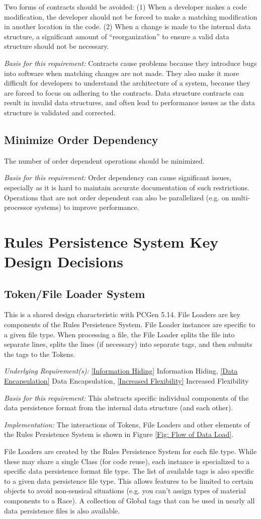 \documentclass[12pt,letterpaper]{article}
\newcommand{\systemEOS}{Rules Persistence System}
\newcommand{\system}{\systemEOS{} }
\newcommand{\textem}[1]{\emph{#1}}
\newcommand{\nsection}[1]{\newpage \section{#1}}
\newcommand{\lnsection}[1]{\label{#1}\nsection{#1}}
\newcommand{\lsubsection}[1]{\label{#1}\subsection{#1}}
\newcommand{\myref}[1]{\ref{#1} #1}
\newcommand{\basis}{\noindent\textem{Basis for this requirement:} }
\newcommand{\impl}{\noindent\textem{Implementation:} }
\newcommand{\under}{\noindent\textem{Underlying Requirement(s):} }
\begin{document}
Two forms of contracts should be avoided: (1) When a developer makes a code modification,
the developer should not be forced to make a matching modification in another location in the
code. (2) When a change is made to the internal data structure, a significant amount of
``reorganization'' to ensure a valid data structure should not be necessary.

\basis Contracts cause problems because they introduce bugs into software when matching changes
are not made.  They also make it more difficult for developers to understand the architecture
of a system, because they are forced to focus on adhering to the contracts.  Data structure
contracts can result in invalid data structures, and often lead to performance issues as the
data structure is validated and corrected.

\lsubsection{Minimize Order Dependency}

The number of order dependent operations should be minimized.

\basis Order dependency can cause significant issues, especially as it is hard to maintain
accurate documentation of such restrictions.  Operations that are not order dependent can
also be parallelized (e.g. on multi-processor systems) to improve performance.

\lnsection{\system Key Design Decisions}

\lsubsection{Token/File Loader System}

This is a shared design characteristic with PCGen 5.14.  File Loaders are key components of
the \systemEOS.  File Loader instances are specific to a given file type.  When processing
a file, the File Loader splits the file into separate lines, splits the lines (if necessary)
into separate tags, and then submits the tags to the Tokens.

\under \myref{Information Hiding}, \myref{Data Encapsulation}, \myref{Increased Flexibility}

\basis This abstracts specific individual components of the data persistence format from the
internal data structure (and each other).

\impl The interactions of Tokens, File Loaders and other elements of the \system is shown in
Figure \ref{Fig: Flow of Data Load}.

File Loaders are created by the \system for each file type.  While these may share 
a single Class (for code reuse), each instance is specialized to a specific data persistence
format file type.  The list of available tags is also specific to a given data persistence
file type.  This allows features to be limited to certain objects to avoid non-sensical
situations (e.g. you can't assign types of material components to a Race).  A collection
of Global tags that can be used in nearly all data persistence files is also available.
\end{document}
